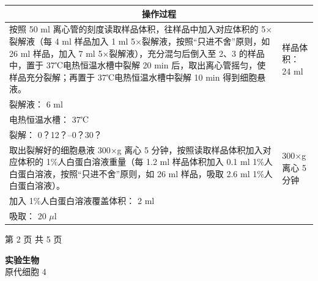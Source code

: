 \documentclass[UTF8,10pt,a4paper,fontset=fandol]{ctexart}
\newcommand{\fieldvalue}[1]{#1}
\newcommand{\handwritten}[1]{#1}
\begin{document}
\begin{tabularx}{\textwidth}{|X|X|}
\hline
\multicolumn{2}{|c|}{操作过程}\\
\hline
按照 50 ml 离心管的刻度读取样品体积，往样品中加入对应体积的 5$\times$裂解液（每 4 ml 样品加入 1 ml 5$\times$裂解液，按照“只进不舍”原则，如 26 ml 样品，加入 7 ml 5$\times$裂解液），充分混匀后倒入至 2、3 的样品中，置于 37℃电热恒温水槽中裂解 20 min 后，取出离心管摇匀，使样品充分裂解；再置于 37℃电热恒温水槽中裂解 10 min 得到细胞悬液。 &
样品体积：
\fieldvalue{\handwritten{24}} ml\\
裂解液：
\fieldvalue{\handwritten{6}} ml\\
电热恒温水槽：
\fieldvalue{\handwritten{37}}℃\\
裂解：
\fieldvalue{\handwritten{0？12？--0？30？}}\\
\hline
取出裂解好的细胞悬液 300$\times$g 离心 5 分钟，按照读取样品体积加入对应体积的 1\%人白蛋白溶液重量（每 1.2 ml 样品体积加入 0.1 ml 1\%人白蛋白溶液，按照“只进不舍”原则，如 26 ml 样品，吸取 2.6 ml 1\%人白蛋白溶液）。 &
\fieldvalue{\handwritten{300$\times$g 离心 5分钟}}\\
加入 1\%人白蛋白溶液覆盖体积：
\fieldvalue{\handwritten{2}} ml\\
吸取：
\fieldvalue{\handwritten{20}} $\mu$l\\
\hline
\end{tabularx}

\begin{center}
第 2 页 共 5 页
\end{center}

\newpage

\begin{center}
\textbf{实验生物}\\
\fieldvalue{原代细胞}
\hspace{3em}
\fieldvalue{4}
\end{center}
\end{document}
